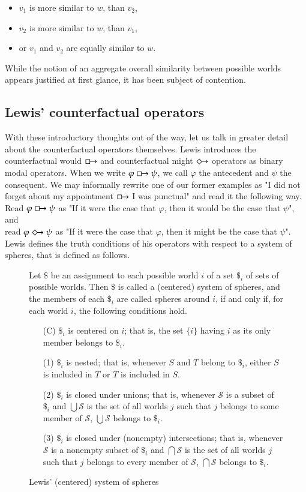 \documentclass[a4paper,american]{paper}
\theoremstyle{definition}\newtheorem{definition}{Definition}
\begin{document}
\begin{itemize}
\item $v_1$ is more similar to $w$, than $v_2$,
\item $v_2$ is more similar to $w$, than $v_1$,
\item or $v_1$ and $v_2$ are equally similar to $w$.
\end{itemize}
While the notion of an aggregate overall similarity between possible worlds appears justified at first glance, it has been subject of contention. \cite{morreau_overall_similarity_2010}
\subsection{Lewis' counterfactual operators}
With these introductory thoughts out of the way, let us talk in greater detail about the counterfactual operators themselves. Lewis introduces the counterfactual would $\boxright$ and counterfactual might $\Diamondright$ operators as binary modal operators. \cite{lewis_counterfactuals_1973} When we write $\varphi\boxright\psi$, we call $\varphi$ the antecedent and $\psi$ the consequent. We may informally rewrite one of our former examples as "I did not forget about my appointment $\boxright$ I was punctual" and read it the following way.\\
Read $\varphi\boxright\psi$ as "If it were the case that $\varphi$, then it would be the case that $\psi$", and\\
read $\varphi\Diamondright\psi$ as "If it were the case that $\varphi$, then it might be the case that $\psi$".\\
Lewis defines the truth conditions of his operators with respect to a system of spheres, that is defined as follows.
\begin{figure}[H]
	Let $\$$ be an assignment to each possible world $i$ of a set $\$_i$ of sets of possible worlds. Then $\$$ is called a (centered) system of spheres, and the members of each $\$_i$ are called spheres around $i$, if and only if, for each world $i$, the following conditions hold.
	\begin{itemize}
	\item[(C)] $\$_i$ is centered on $i$; that is, the set $\{i\}$ having $i$ as its only member belongs to $\$_i$.
	\item[(1)] $\$_i$ is nested; that is, whenever $S$ and $T$ belong to $\$_i$, either $S$ is included in $T$ or $T$ is included in $S$.
	\item[(2)] $\$_i$ is closed under unions; that is, whenever $\mathscr{S}$ is a subset of $\$_i$ and $\bigcup\mathscr{S}$ is the set of all worlds $j$ such that $j$ belongs to some member of $\mathscr{S}$, $\bigcup\mathscr{S}$ belongs to $\$_i$.
	\item[(3)] $\$_i$ is closed under (nonempty) intersections; that is, whenever $\mathscr{S}$ is a nonempty subset of $\$_i$ and $\bigcap\mathscr{S}$ is the set of all worlds $j$ such that $j$ belongs to every member of $\mathscr{S}$, $\bigcap\mathscr{S}$ belongs to $\$_i$.
	\end{itemize}
	\caption{Lewis' (centered) system of spheres}
	\label{fig:system_of_spheres}
\end{figure}
\end{document}
